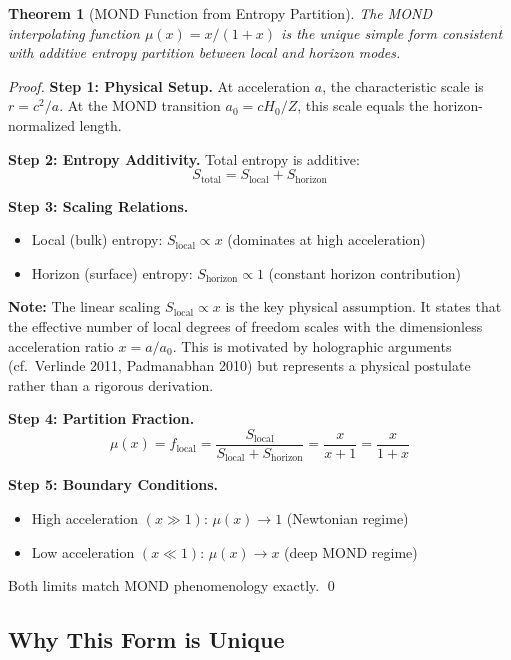 \documentclass[11pt,a4paper]{article}
\theoremstyle{plain}
\newtheorem{theorem}{Theorem}[section]
\theoremstyle{definition}
\theoremstyle{remark}
\begin{document}
\begin{theorem}[MOND Function from Entropy Partition]
The MOND interpolating function $\mu(x) = x/(1+x)$ is the unique simple form consistent with additive entropy partition between local and horizon modes.
\end{theorem}

\begin{proof}
\textbf{Step 1: Physical Setup.} At acceleration $a$, the characteristic scale is $r = c^2/a$. At the MOND transition $a_0 = cH_0/Z$, this scale equals the horizon-normalized length.

\textbf{Step 2: Entropy Additivity.} Total entropy is additive:
\[
S_{\text{total}} = S_{\text{local}} + S_{\text{horizon}}
\]

\textbf{Step 3: Scaling Relations.}
\begin{itemize}
  \item Local (bulk) entropy: $S_{\text{local}} \propto x$ (dominates at high acceleration)
  \item Horizon (surface) entropy: $S_{\text{horizon}} \propto 1$ (constant horizon contribution)
\end{itemize}

\textbf{Note:} The linear scaling $S_{\text{local}} \propto x$ is the key physical assumption. It states that the effective number of local degrees of freedom scales with the dimensionless acceleration ratio $x = a/a_0$. This is motivated by holographic arguments (cf.\ Verlinde 2011, Padmanabhan 2010) but represents a physical postulate rather than a rigorous derivation.

\textbf{Step 4: Partition Fraction.}
\[
\mu(x) = f_{\text{local}} = \frac{S_{\text{local}}}{S_{\text{local}} + S_{\text{horizon}}} = \frac{x}{x + 1} = \frac{x}{1 + x}
\]

\textbf{Step 5: Boundary Conditions.}
\begin{itemize}
  \item High acceleration $(x \gg 1)$: $\mu(x) \to 1$ (Newtonian regime)
  \item Low acceleration $(x \ll 1)$: $\mu(x) \to x$ (deep MOND regime)
\end{itemize}

Both limits match MOND phenomenology exactly. \qed
\end{proof}

\subsection{Why This Form is Unique}
\end{document}

